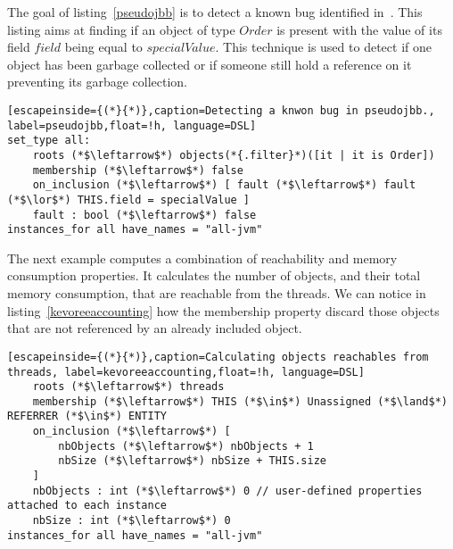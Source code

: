 The goal of listing~\ref{pseudojbb} is to detect a known bug identified in~\cite{Aftandilian:2009:GAU:1543135.1542503}.
This listing aims at finding if an object of type $Order$ is present 
with the value of its field $field$ being equal to $specialValue$.
This technique is used to detect if one object has been garbage collected or if someone still hold a reference on it preventing its garbage collection.
\begin{lstlisting}[escapeinside={(*}{*)},caption=Detecting a knwon bug in pseudojbb., label=pseudojbb,float=!h, language=DSL]
set_type all: 
	roots (*$\leftarrow$*) objects(*{.filter}*)([it | it is Order])
	membership (*$\leftarrow$*) false
	on_inclusion (*$\leftarrow$*) [ fault (*$\leftarrow$*) fault (*$\lor$*) THIS.field = specialValue ]
	fault : bool (*$\leftarrow$*) false
instances_for all have_names = "all-jvm"
\end{lstlisting}

The next example computes a combination of reachability and memory consumption properties.
It calculates the number of objects, and their total memory consumption, that are reachable from the threads.
We can notice in listing~\ref{kevoreeaccounting} how the membership property discard those objects that are not referenced by an already included object.  

\begin{lstlisting}[escapeinside={(*}{*)},caption=Calculating objects reachables from threads, label=kevoreeaccounting,float=!h, language=DSL]
	roots (*$\leftarrow$*) threads
	membership (*$\leftarrow$*) THIS (*$\in$*) Unassigned (*$\land$*) REFERRER (*$\in$*) ENTITY
	on_inclusion (*$\leftarrow$*) [      
		nbObjects (*$\leftarrow$*) nbObjects + 1  
		nbSize (*$\leftarrow$*) nbSize + THIS.size
	]
	nbObjects : int (*$\leftarrow$*) 0 // user-defined properties attached to each instance
	nbSize : int (*$\leftarrow$*) 0 
instances_for all have_names = "all-jvm"
\end{lstlisting}

